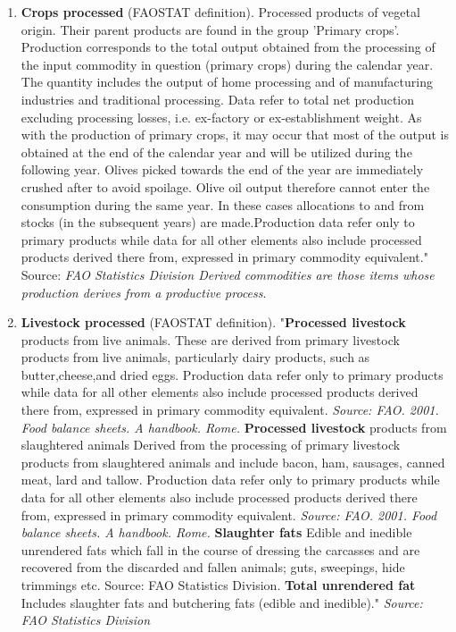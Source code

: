 \documentclass[nojss]{jss}
\begin{document}
\begin{enumerate}

\item{\textbf{Crops processed} (FAOSTAT definition). Processed products of vegetal origin. Their parent products are found in the group 'Primary crops'. Production corresponds to the total output obtained from the processing of the input commodity in question (primary crops) during the calendar year. The quantity includes the output of home processing and of manufacturing industries and traditional processing. Data refer to total net production excluding processing losses, i.e. ex-factory or ex-establishment weight. As with the production of primary crops, it may occur that most of the output is obtained at the end of the calendar year and will be utilized during the following year. Olives picked towards the end of the year are immediately crushed after to avoid spoilage. Olive oil output therefore cannot enter the consumption during the same year. In these cases allocations to and from stocks (in the subsequent years) are made.Production data refer only to primary products while data for all other elements also include processed products derived there from, expressed in primary commodity equivalent." Source: \textit{FAO Statistics Division Derived commodities are those items whose production derives from a productive process}.
}

\item{ \textbf{Livestock processed} (FAOSTAT definition). "\textbf{Processed livestock} products from live animals. These are derived from primary livestock products from live animals, particularly dairy products, such as butter,cheese,and dried eggs. Production data refer only to primary products while data for all other elements also include processed products derived there from, expressed in primary commodity equivalent. \textit{Source: FAO. 2001. Food balance sheets. A handbook. Rome.} \textbf{Processed livestock} products from slaughtered animals	Derived from the processing of primary livestock products from slaughtered animals and include bacon, ham, sausages, canned meat, lard and tallow. Production data refer only to primary products while data for all other elements also include processed products derived there from, expressed in primary commodity equivalent. \textit{Source: FAO. 2001. Food balance sheets. A handbook. Rome.}	\textbf{Slaughter fats}	Edible and inedible unrendered fats which fall in the course of dressing the carcasses and are recovered from the discarded and fallen animals; guts, sweepings, hide trimmings etc. Source: FAO Statistics Division. \textbf{Total unrendered fat}	Includes slaughter fats and butchering fats (edible and inedible)." \textit{Source: FAO Statistics Division}}


\end{enumerate}
\end{document}
